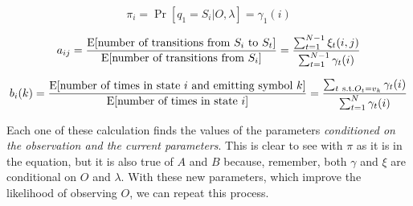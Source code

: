 \begin{equation}
  \pi_i = \Pr[q_1 = S_i \vert O,\lambda] = \gamma_1(i)
\end{equation}

\begin{equation}
  a_{ij} = \frac{\mathrm{E}[\textrm{number of transitions from $S_i$ to
  $S_t$}]}{\mathrm{E}[\textrm{number of transitions from $S_i$}]} =
  \frac{\sum_{t=1}^{N-1} \xi_t(i,j)}{\sum_{t=1}^{N-1} \gamma_t(i)}
\end{equation}

\begin{equation}
  b_i(k) = \frac{\E[\textrm{number of times in state $i$ and emitting symbol
  $k$}]}{\E[\textrm{number of times in state $i$}]} = \frac{\sum_{t\ \textrm{s.t.} O_t = v_k} \gamma_t(i)}{\sum_{t=1}^N \gamma_t(i)}
\end{equation}

Each one of these calculation finds the values of the parameters
\emph{conditioned on the observation and the current parameters}. This
is clear to see with $\pi$ as it is in the equation, but it is also true
of $A$ and $B$ because, remember, both $\gamma$ and $\xi$ are
conditional on $O$ and $\lambda$. With these new parameters, which
improve the likelihood of observing $O$, we can repeat this process.
